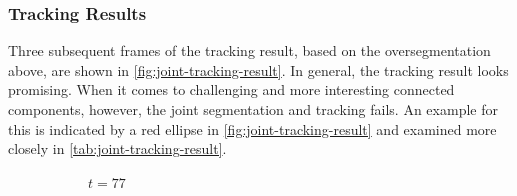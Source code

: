 \subsubsection{Tracking Results}
\label{subsubsec:joint-experiment-tracking}
Three subsequent frames of the tracking result, based on the oversegmentation above, are shown in
\cref{fig:joint-tracking-result}. In general, the tracking result looks promising. When it comes to
challenging and more interesting connected components, however, the joint segmentation and tracking
fails. An example for this is indicated by a red ellipse in \cref{fig:joint-tracking-result} and
examined more closely in \cref{tab:joint-tracking-result}.
\begin{figure}
    \begin{subfigure}[t]{0.3\textwidth}
        \caption{$t=77$}
    \end{subfigure}
    \hfill
    \begin{subfigure}[t]{0.3\textwidth}

\end{subfigure}
\end{figure}
